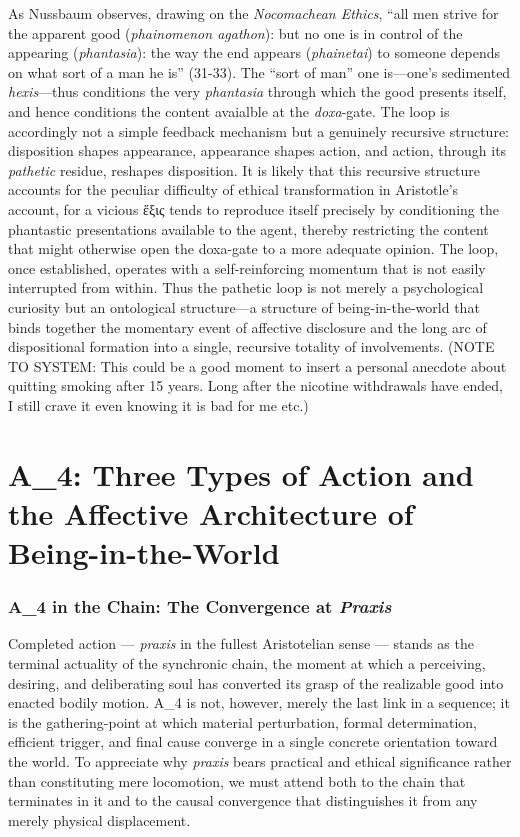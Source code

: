 \documentclass{article}
\newcommand{\gk}[1]{{\greekfont #1}}
\begin{document}
\begin{list}
    \item As Nussbaum observes, drawing on the \textit{Nocomachean Ethics}, ``all men strive for the apparent good (\textit{phainomenon agathon}): but no one is in control of the appearing (\textit{phantasia}): the way the end appears (\textit{phainetai}) to someone depends on what sort of a man he is'' (31-33). The ``sort of man'' one is---one's sedimented \textit{hexis}---thus conditions the very \textit{phantasia} through which the good presents itself, and hence conditions the content avaialble at the \textit{doxa}-gate. The loop is accordingly not a simple feedback mechanism but a genuinely recursive structure: disposition shapes appearance, appearance shapes action, and action, through its \textit{pathetic} residue, reshapes disposition. It is likely that this recursive structure accounts for the peculiar difficulty of ethical transformation in Aristotle's account, for a vicious \gk{ἕξις} tends to reproduce itself precisely by conditioning the phantastic presentations available to the agent, thereby restricting the content that might otherwise open the doxa-gate to a more adequate opinion. The loop, once established, operates with a self-reinforcing momentum that is not easily interrupted from within. Thus the pathetic loop is not merely a psychological curiosity but an ontological structure—a structure of being-in-the-world that binds together the momentary event of affective disclosure and the long arc of dispositional formation into a single, recursive totality of involvements. (NOTE TO SYSTEM: This could be a good moment to insert a personal anecdote about quitting smoking after 15 years. Long after the nicotine withdrawals have ended, I still crave it even knowing it is bad for me etc.)
    
    \item  
\end{list}

\section{A\_4: Three Types of Action and the Affective Architecture of Being-in-the-World}

\subsubsection*{A\_4 in the Chain: The Convergence at \textit{Praxis}}

Completed action --- \textit{praxis} in the fullest Aristotelian sense --- stands as the terminal actuality of the synchronic chain, the moment at which a perceiving, desiring, and deliberating soul has converted its grasp of the realizable good into enacted bodily motion. A\_4 is not, however, merely the last link in a sequence; it is the gathering-point at which material perturbation, formal determination, efficient trigger, and final cause converge in a single concrete orientation toward the world. To appreciate why \textit{praxis} bears practical and ethical significance rather than constituting mere locomotion, we must attend both to the chain that terminates in it and to the causal convergence that distinguishes it from any merely physical displacement.
\end{document}
